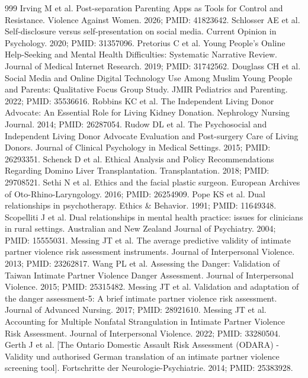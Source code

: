 \documentclass[11pt]{article}
\begin{document}
\begin{thebibliography}{999}
 Irving M et al. Post-separation Parenting Apps as Tools for Control and Resistance. Violence Against Women. 2026; PMID: 41823642.
 Schlosser AE et al. Self-disclosure versus self-presentation on social media. Current Opinion in Psychology. 2020; PMID: 31357096.
 Pretorius C et al. Young People's Online Help-Seeking and Mental Health Difficulties: Systematic Narrative Review. Journal of Medical Internet Research. 2019; PMID: 31742562.
 Douglass CH et al. Social Media and Online Digital Technology Use Among Muslim Young People and Parents: Qualitative Focus Group Study. JMIR Pediatrics and Parenting. 2022; PMID: 35536616.
 Robbins KC et al. The Independent Living Donor Advocate: An Essential Role for Living Kidney Donation. Nephrology Nursing Journal. 2014; PMID: 26287054.
 Rudow DL et al. The Psychosocial and Independent Living Donor Advocate Evaluation and Post-surgery Care of Living Donors. Journal of Clinical Psychology in Medical Settings. 2015; PMID: 26293351.
 Schenck D et al. Ethical Analysis and Policy Recommendations Regarding Domino Liver Transplantation. Transplantation. 2018; PMID: 29708521.
 Sethi N et al. Ethics and the facial plastic surgeon. European Archives of Oto-Rhino-Laryngology. 2016; PMID: 26254909.
 Pope KS et al. Dual relationships in psychotherapy. Ethics \& Behavior. 1991; PMID: 11649348.
 Scopelliti J et al. Dual relationships in mental health practice: issues for clinicians in rural settings. Australian and New Zealand Journal of Psychiatry. 2004; PMID: 15555031.
 Messing JT et al. The average predictive validity of intimate partner violence risk assessment instruments. Journal of Interpersonal Violence. 2013; PMID: 23262817.
 Wang PL et al. Assessing the Danger: Validation of Taiwan Intimate Partner Violence Danger Assessment. Journal of Interpersonal Violence. 2015; PMID: 25315482.
 Messing JT et al. Validation and adaptation of the danger assessment-5: A brief intimate partner violence risk assessment. Journal of Advanced Nursing. 2017; PMID: 28921610.
 Messing JT et al. Accounting for Multiple Nonfatal Strangulation in Intimate Partner Violence Risk Assessment. Journal of Interpersonal Violence. 2022; PMID: 33280504.
 Gerth J et al. [The Ontario Domestic Assault Risk Assessment (ODARA) - Validity und authorised German translation of an intimate partner violence screening tool]. Fortschritte der Neurologie-Psychiatrie. 2014; PMID: 25383928.

\end{thebibliography}
\end{document}
